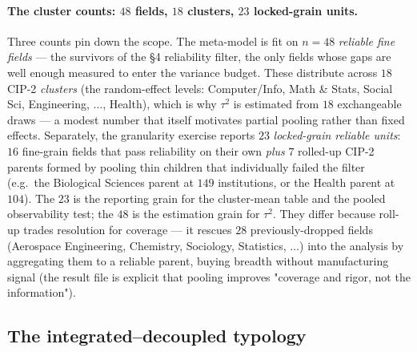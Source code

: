 \documentclass[11pt]{article}
\begin{document}
\paragraph{The cluster counts: $48$ fields, $18$ clusters, $23$ locked-grain units.} Three counts pin down the scope. The meta-model is fit on $n=48$ \emph{reliable fine fields} --- the survivors of the \S4 reliability filter, the only fields whose gaps are well enough measured to enter the variance budget. These distribute across $18$ CIP-2 \emph{clusters} (the random-effect levels: Computer/Info, Math \& Stats, Social Sci, Engineering, $\dots$, Health), which is why $\tau^2$ is estimated from $18$ exchangeable draws --- a modest number that itself motivates partial pooling rather than fixed effects. Separately, the granularity exercise reports $23$ \emph{locked-grain reliable units}: $16$ fine-grain fields that pass reliability on their own \emph{plus} $7$ rolled-up CIP-2 parents formed by pooling thin children that individually failed the filter (e.g.\ the Biological Sciences parent at $149$ institutions, or the Health parent at $104$). The $23$ is the reporting grain for the cluster-mean table and the pooled observability test; the $48$ is the estimation grain for $\tau^2$. They differ because roll-up trades resolution for coverage --- it rescues $28$ previously-dropped fields (Aerospace Engineering, Chemistry, Sociology, Statistics, $\dots$) into the analysis by aggregating them to a reliable parent, buying breadth without manufacturing signal (the result file is explicit that pooling improves "coverage and rigor, not the information").

\subsection{The integrated--decoupled typology}
\end{document}
